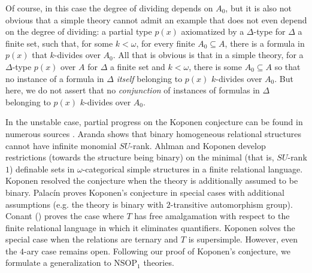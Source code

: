\documentclass[11pt]{amsart}
\theoremstyle{definition}
\theoremstyle{remark}
\numberwithin{equation}{section}
\begin{document}
{Of course, in this case the degree of dividing depends on $A_{0}$, but it is also not obvious that a simple theory cannot admit an example that does not even depend on the degree of dividing: a partial type $p(x)$ axiomatized by a $\Delta$-type for $\Delta$ a finite set, such that, for some $k < \omega$, for every finite $A_{0} \subseteq A $, there is a formula in $p(x)$ that $k$-divides over $A_{0}$. All that is obvious is that in a simple theory, for a $\Delta$-type $p(x)$ over $A$ for $\Delta$ a finite set and $k < \omega$, there is some $A_{0} \subseteq A$ so that no instance of a formula in $\Delta$ \textit{itself} belonging to $p(x)$ $k$-divides over $A_{0}$. But here, we do not assert that no \textit{conjunction} of instances of formulas in $\Delta$ belonging to $p(x)$ $k$-divides over $A_{0}$.}

In the unstable case, partial progress on the Koponen conjecture can be found in numerous sources \cite{aranda2013omega, AKop15, Kop16, Kop17, Pal17, Kop19}. Aranda \cite{aranda2013omega} shows that binary homogeneous relational structures cannot have infinite monomial $SU$-rank. Ahlman and Koponen \cite{AKop15} develop restrictions (towards the structure being binary) on the minimal (that is, $SU$-rank $1$) definable sets in $\omega$-categorical simple structures in a finite relational language. Koponen \cite{Kop16} resolved the conjecture when the theory is additionally assumed to be binary. Palac\'in \cite{Pal17} proves Koponen's conjecture in special cases with additional assumptions (e.g. the theory is binary with $2$-transitive automorphism group). Conant (\cite{Co15}) proves the case where $T$ has free amalgamation with respect to the finite relational language in which it eliminates quantifiers. Koponen \cite{Kop19} solves the special case when the relations are ternary and $T$ is supersimple. However, even the $4$-ary case remains open. Following our proof of Koponen's conjecture, we formulate a generalization to $\mathrm{NSOP}_{1}$ theories. 
\end{document}
